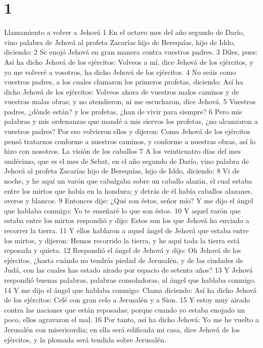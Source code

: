 
\chapter{1}

Llamamiento a volver a Jehová
1 En el octavo mes del año segundo de Darío, vino palabra de Jehová al profeta Zacarías hijo de Berequías, hijo de Iddo, diciendo:
2 Se enojó Jehová en gran manera contra vuestros padres.
3 Diles, pues: Así ha dicho Jehová de los ejércitos: Volveos a mí, dice Jehová de los ejércitos, y yo me volveré a vosotros, ha dicho Jehová de los ejércitos.
4 No seáis como vuestros padres, a los cuales clamaron los primeros profetas, diciendo: Así ha dicho Jehová de los ejércitos: Volveos ahora de vuestros malos caminos y de vuestras malas obras; y no atendieron, ni me escucharon, dice Jehová.
5 Vuestros padres, ¿dónde están? y los profetas, ¿han de vivir para siempre?
6 Pero mis palabras y mis ordenanzas que mandé a mis siervos los profetas, ¿no alcanzaron a vuestros padres? Por eso volvieron ellos y dijeron: Como Jehová de los ejércitos pensó tratarnos conforme a nuestros caminos, y conforme a nuestras obras, así lo hizo con nosotros.
La visión de los caballos
7 A los veinticuatro días del mes undécimo, que es el mes de Sebat, en el año segundo de Darío, vino palabra de Jehová al profeta Zacarías hijo de Berequías, hijo de Iddo, diciendo:
8 Vi de noche, y he aquí un varón que cabalgaba sobre un caballo alazán, el cual estaba entre los mirtos que había en la hondura; y detrás de él había caballos alazanes, overos y blancos. 
9 Entonces dije: ¿Qué son éstos, señor mío? Y me dijo el ángel que hablaba conmigo: Yo te enseñaré lo que son éstos.
10 Y aquel varón que estaba entre los mirtos respondió y dijo: Estos son los que Jehová ha enviado a recorrer la tierra.
11 Y ellos hablaron a aquel ángel de Jehová que estaba entre los mirtos, y dijeron: Hemos recorrido la tierra, y he aquí toda la tierra está reposada y quieta.
12 Respondió el ángel de Jehová y dijo: Oh Jehová de los ejércitos, ¿hasta cuándo no tendrás piedad de Jerusalén, y de las ciudades de Judá, con las cuales has estado airado por espacio de setenta años?
13 Y Jehová respondió buenas palabras, palabras consoladoras, al ángel que hablaba conmigo.
14 Y me dijo el ángel que hablaba conmigo: Clama diciendo: Así ha dicho Jehová de los ejércitos: Celé con gran celo a Jerusalén y a Sion.
15 Y estoy muy airado contra las naciones que están reposadas; porque cuando yo estaba enojado un poco, ellos agravaron el mal.
16 Por tanto, así ha dicho Jehová: Yo me he vuelto a Jerusalén con misericordia; en ella será edificada mi casa, dice Jehová de los ejércitos, y la plomada será tendida sobre Jerusalén.
